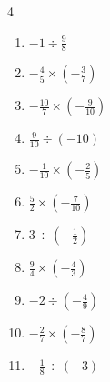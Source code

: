 \begin{multicols}{4}
\begin{enumerate}

  \item $\displaystyle -1\div{}\frac{9}{8}$


\columnbreak %

  \item $\displaystyle -\frac{4}{5}\times{}\left(-\frac{3}{7}\right)$


  \item $\displaystyle -\frac{10}{7}\times{}\left(-\frac{9}{10}\right)$


  \item $\displaystyle \frac{9}{10}\div{}\left(-10\right)$


  \item $\displaystyle -\frac{1}{10}\times{}\left(-\frac{2}{5}\right)$


  \item $\displaystyle \frac{5}{2}\times{}\left(-\frac{7}{10}\right)$


  \item $\displaystyle 3\div{}\left(-\frac{1}{2}\right)$

        \phantom{$\displaystyle =-6$}

  \item $\displaystyle \frac{9}{4}\times{}\left(-\frac{4}{3}\right)$

        \phantom{$\displaystyle =-3$}

  \item $\displaystyle -2\div{}\left(-\frac{4}{9}\right)$


  \item $\displaystyle -\frac{2}{7}\times{}\left(-\frac{8}{7}\right)$


  \item $\displaystyle -\frac{1}{8}\div{}\left(-3\right)$


\end{enumerate}
\end{multicols}
